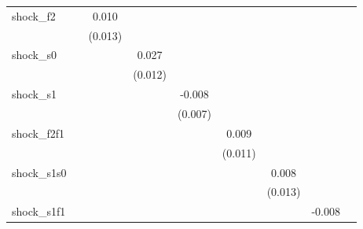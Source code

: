 {\begin{tabular}{l*{8}{c}}
\addlinespace
shock\_f2    &                     &       0.010         &                     &                     &                     &                     &                     &                     \\
            &                     &     (0.013)         &                     &                     &                     &                     &                     &                     \\
\addlinespace
shock\_s0    &                     &                     &       0.027\sym{**} &                     &                     &                     &                     &                     \\
            &                     &                     &     (0.012)         &                     &                     &                     &                     &                     \\
\addlinespace
shock\_s1    &                     &                     &                     &      -0.008         &                     &                     &                     &                     \\
            &                     &                     &                     &     (0.007)         &                     &                     &                     &                     \\
\addlinespace
shock\_f2f1  &                     &                     &                     &                     &       0.009         &                     &                     &                     \\
            &                     &                     &                     &                     &     (0.011)         &                     &                     &                     \\
\addlinespace
shock\_s1s0  &                     &                     &                     &                     &                     &       0.008         &                     &                     \\
            &                     &                     &                     &                     &                     &     (0.013)         &                     &                     \\
\addlinespace
shock\_s1f1  &                     &                     &                     &                     &                     &                     &      -0.008         &                     \\

\end{tabular}}

